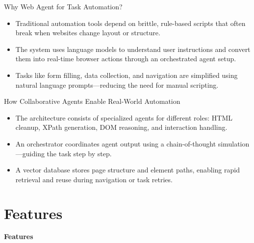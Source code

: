 \documentclass{beamer}
\begin{document}
\begin{frame}{Why Web Agent for Task Automation?}
\begin{itemize}
  \item Traditional automation tools depend on brittle, rule-based scripts that often break when websites change layout or structure.
  \item The system uses language models to understand user instructions and convert them into real-time browser actions through an orchestrated agent setup.
  \item Tasks like form filling, data collection, and navigation are simplified using natural language prompts—reducing the need for manual scripting.
\end{itemize}
\end{frame}



\begin{frame}{How Collaborative Agents Enable Real-World Automation}
\begin{itemize}
  \item The architecture consists of specialized agents for different roles: HTML cleanup, XPath generation, DOM reasoning, and interaction handling.
  \item An orchestrator coordinates agent output using a chain-of-thought simulation—guiding the task step by step.
  \item A vector database stores page structure and element paths, enabling rapid retrieval and reuse during navigation or task retries.
\end{itemize}
\end{frame}


\section{Features}

\begin{frame}
\centering
\Huge \textbf{Features}
\end{frame}
\end{document}
